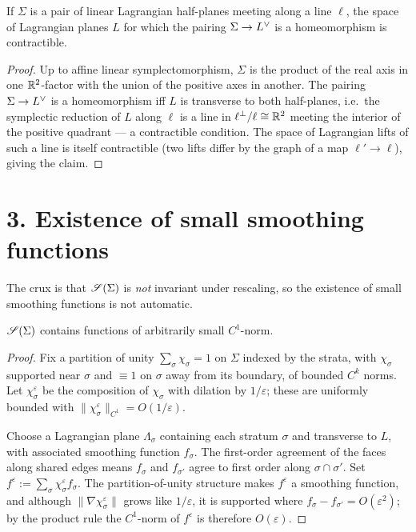 \begin{qeightlemma}\label{lem:edge}
If $\Sigma$ is a pair of linear Lagrangian half-planes meeting along a line
$\ell$, the space of Lagrangian planes $L$ for which the pairing
$\Sigma\to L^{\vee}$ is a homeomorphism is contractible.
\end{qeightlemma}

\begin{proof}
Up to affine linear symplectomorphism, $\Sigma$ is the product of the real axis
in one $\mathbb{R}^2$-factor with the union of the positive axes in another. The pairing
$\Sigma\to L^{\vee}$ is a homeomorphism iff $L$ is transverse to both half-planes,
i.e.\ the symplectic reduction of $L$ along $\ell$ is a line in $\ell^\perp/\ell\cong\mathbb{R}^2$
meeting the interior of the positive quadrant — a contractible condition. The
space of Lagrangian lifts of such a line is itself contractible (two lifts differ
by the graph of a map $\ell'\to\ell$), giving the claim.
\end{proof}

\section*{3. Existence of small smoothing functions}

The crux is that $\mathscr S(\Sigma)$ is \emph{not} invariant under rescaling, so the
existence of small smoothing functions is not automatic.

\begin{qeightlemma}\label{lem:small}
$\mathscr S(\Sigma)$ contains functions of arbitrarily small $C^1$-norm.
\end{qeightlemma}

\begin{proof}
Fix a partition of unity $\sum_\sigma \chi_\sigma=1$ on $\Sigma$ indexed by the
strata, with $\chi_\sigma$ supported near $\sigma$ and $\equiv1$ on $\sigma$ away
from its boundary, of bounded $C^k$ norms. Let $\chi_\sigma^\varepsilon$ be the
composition of $\chi_\sigma$ with dilation by $1/\varepsilon$; these are
uniformly bounded with $\|\chi_\sigma^\varepsilon\|_{C^1}=O(1/\varepsilon)$.

Choose a Lagrangian plane $\Lambda_\sigma$ containing each stratum $\sigma$ and
transverse to $L$, with associated smoothing function $f_\sigma$. The first-order
agreement of the faces along shared edges means $f_\sigma$ and $f_{\sigma'}$ agree
to first order along $\sigma\cap\sigma'$. Set $f^\varepsilon:=\sum_\sigma
\chi_\sigma^\varepsilon f_\sigma$. The partition-of-unity structure makes
$f^\varepsilon$ a smoothing function, and although $\|\nabla\chi_\sigma^\varepsilon\|$
grows like $1/\varepsilon$, it is supported where $f_\sigma-f_{\sigma'}=O(\varepsilon^2)$;
by the product rule the $C^1$-norm of $f^\varepsilon$ is therefore $O(\varepsilon)$.
\end{proof}

